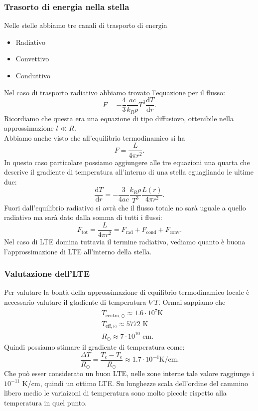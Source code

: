 \subsubsection{Trasorto di energia nella stella}
\label{subsubsec:Trasorto di energia nella stella}

Nelle stelle abbiamo tre canali di trasporto di energia
\begin{itemize}
	\item Radiativo
	\item Convettivo
	\item Conduttivo
\end{itemize}
Nel caso di trasporto radiativo abbiamo trovato l'equazione per il flusso:
\[
	F = -\frac{4}{3}\frac{ac}{k_R \rho } T^3 \frac{\mbox{d} T}{\mbox{d} r} 
.\] 
Ricordiamo che questa era una equazione di tipo diffusiovo, ottenibile nella approssimazione $l \ll R$.\\
Abbiamo anche visto che all'equilibrio termodinamico si ha
\[
	F = \frac{L}{4\pi r^2}
.\] 
In questo caso particolare possiamo aggiungere alle tre equazioni una quarta che descrive il gradiente di temperatura all'interno di una stella eguagliando le ultime due:
\[
	\frac{\mbox{d} T}{\mbox{d} r} = -\frac{3}{4ac}\frac{k_R\rho }{T^3}\frac{L(r)}{4\pi r^2}
.\] 
Fuori dall'equilibrio radiativo si avrà che il flusso totale no sarà uguale a quello radiativo ma sarà dato dalla somma di tutti i flussi:
\[
	F_\text{tot} =
	\frac{L}{4\pi r^2} 
	=
	F_\text{rad} + F_\text{cond} + F_\text{conv} 
.\] 
Nel caso di LTE domina tuttavia il termine radiativo, vediamo quanto è buona l'approssimazione di LTE all'interno della stella.
\subsubsection{Valutazione dell'LTE}
\label{subsubsec:Valutazione dell'LTE}
Per valutare la bontà della approssimazione di equilibrio termodinamico locale è necessario valutare il gtadiente di temperatura $\nabla T$. Ormai sappiamo che
\[\begin{aligned}
	&T_{\text{centro},\odot} \approx 1.6 \cdot 10^{7} \text{K}\\
	&T_{\text{eff},\odot} \approx 5772 \text{ K}\\
	&R_{\odot} \approx 7 \cdot 10^{10} \text{ cm}
.\end{aligned}\]
Quindi possiamo stimare il gradiente di temperatura come:
\[
	\frac{\Delta T}{R_{\odot}} = \frac{T_c - T_e}{R_{\odot}} \approx 1.7 \cdot 10^{-4} \text{K/cm}
.\] 
Che può esser considerato un buon LTE, nelle zone interne tale valore raggiunge i $10^{-11}$ K/cm, quindi un ottimo LTE. Su lunghezze scala dell'ordine del cammino libero medio le variaizoni di temperatura sono molto piccole rispetto alla temperatura in quel punto.
